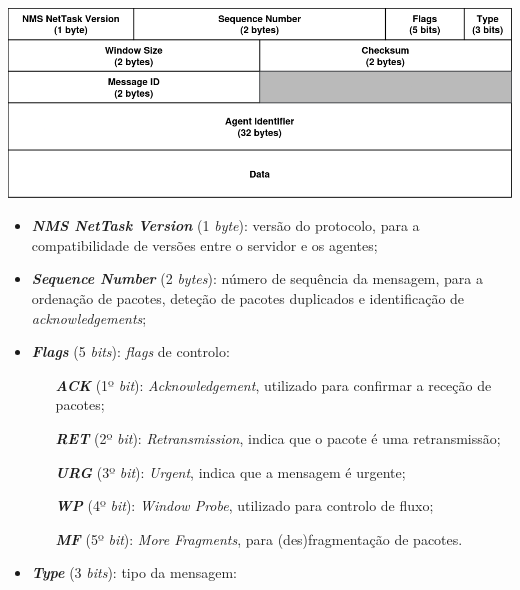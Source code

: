\documentclass[a4paper,12pt]{scrreprt}
\begin{document}
\begin{minipage}{\textwidth}
    \centering
    \includegraphics[width=\textwidth]{img/nettask_header.png}
    \label{fig:nettask_message_format}
\end{minipage}

\begin{itemize}
    \item \textbf{\textit{NMS NetTask Version}} (1 \textit{byte}):  versão do protocolo,
        para a compatibilidade de versões entre o servidor e os agentes;
    \item \textbf{\textit{Sequence Number}}     (2 \textit{bytes}): número de sequência da mensagem,
        para a ordenação de pacotes, deteção de pacotes duplicados e identificação de \textit{acknowledgements};
    \item \textbf{\textit{Flags}}               (5 \textit{bits}):  \textit{flags} de controlo:
        \begin{itemize}
           \item [\textbf{\textit{ACK}}] (1º \textit{bit}): \textit{Acknowledgement}, utilizado para confirmar a receção de pacotes;
           \item [\textbf{\textit{RET}}] (2º \textit{bit}): \textit{Retransmission}, indica que o pacote é uma retransmissão;
           \item [\textbf{\textit{URG}}] (3º \textit{bit}): \textit{Urgent}, indica que a mensagem é urgente;
           \item [\textbf{\textit{WP}} ] (4º \textit{bit}): \textit{Window Probe}, utilizado para controlo de fluxo;
           \item [\textbf{\textit{MF}} ] (5º \textit{bit}): \textit{More Fragments}, para (des)fragmentação de pacotes.
        \end{itemize}
    \item \textbf{\textit{Type}}                (3 \textit{bits}): tipo da mensagem:
        \begin{itemize}

\end{itemize}
\end{itemize}
\end{document}
